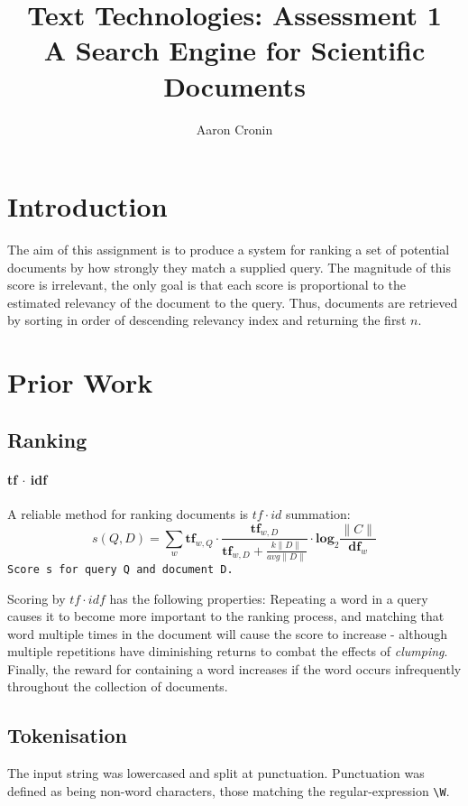 \documentclass[10pt, a4paper, twocolumn]{article}   	%
\title{Text Technologies: Assessment 1 \\
A Search Engine for Scientific Documents}
\author{Aaron Cronin}
\date	{}						%
\begin{document}
\maketitle
\section{Introduction}
The aim of this assignment is to produce a system for ranking a set of potential documents by how strongly they match a supplied query. The magnitude of this score is irrelevant, the only goal is that each score is proportional to the estimated relevancy of the document to the query. Thus, documents are retrieved by sorting in order of descending relevancy index and returning the first $n$.
\section{Prior Work}
\subsection{Ranking}
\paragraph{tf $\cdot$ idf}
A reliable method for ranking documents is $tf \cdot id$ summation:
\begin{equation}
s(Q,D) = \sum_{w}\mathbf{tf}_{w, Q} \cdot \frac
{\mathbf{tf}_{w, D}}
{\mathbf{tf}_{w, D} + \frac{k \|D\|}{avg \|D\|}} \cdot \mathbf{log}_{2}\frac{\|C\|}{\mathbf{df}_{w}}
\end{equation}
\verb|Score s for query Q and document D.|

Scoring by $tf \cdot idf$ has the following properties: Repeating a word in a query causes it to become more important to the ranking process, and matching that word multiple times in the document will cause the score to increase - although multiple repetitions have diminishing returns to combat the effects of \emph{clumping}. Finally, the reward for containing a word increases if the word occurs infrequently throughout the collection of documents.

\subsection{Tokenisation}
The input string was lowercased and split at punctuation. Punctuation was defined as being non-word characters, those matching the regular-expression \verb|\W|.
\end{document}
